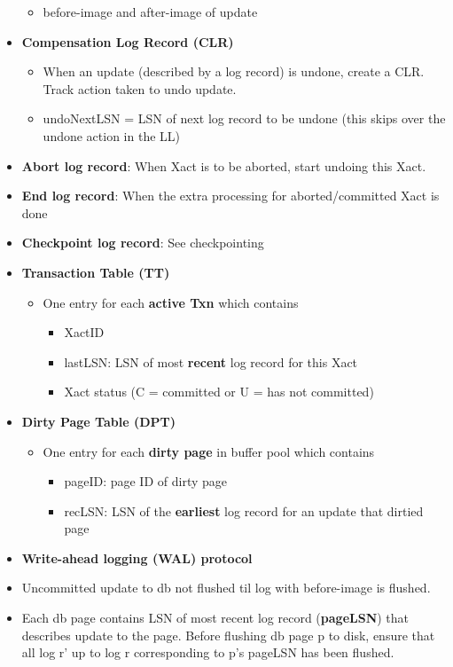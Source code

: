 \documentclass[8pt, landscape]{extarticle}
\begin{document}
\begin{multicols*}{4}
\begin{itemize}
\begin{itemize}
    \item before-image and after-image of update
  \end{itemize}
  \item \textbf{Compensation Log Record (CLR)}
  \begin{itemize}
    \item When an update (described by a log record) is undone, create a CLR. Track action taken to undo update.
    \item undoNextLSN = LSN of next log record to be undone (this skips over the undone action in the LL) 
  \end{itemize}
  \item \textbf{Abort log record}: When Xact is to be aborted, start undoing this Xact.
  \item \textbf{End log record}: When the extra processing for aborted/committed Xact is done
  \item \textbf{Checkpoint log record}: See checkpointing
  \item \textbf{Transaction Table (TT)}
  \begin{itemize}
    \item One entry for each \textbf{active Txn} which contains
    \begin{itemize}
      \item XactID
      \item lastLSN: LSN of most \textbf{recent} log record for this Xact
      \item Xact status (C = committed or U = has not committed)
    \end{itemize}
  \end{itemize}
  \item \textbf{Dirty Page Table (DPT)}
  \begin{itemize}
    \item One entry for each \textbf{dirty page} in buffer pool which contains
    \begin{itemize}
      \item pageID: page ID of dirty page
      \item recLSN: LSN of the \textbf{earliest} log record for an update that dirtied page
    \end{itemize}
  \end{itemize}
  \item \textbf{Write-ahead logging (WAL) protocol}
  \item Uncommitted update to db not flushed til log with before-image is flushed.
  \item Each db page contains LSN of most recent log record (\textbf{pageLSN}) that describes update to the page. Before flushing db page p to disk, ensure that all log r' up to log r corresponding to p's pageLSN has been flushed.

\end{itemize}
\end{multicols*}
\end{document}
